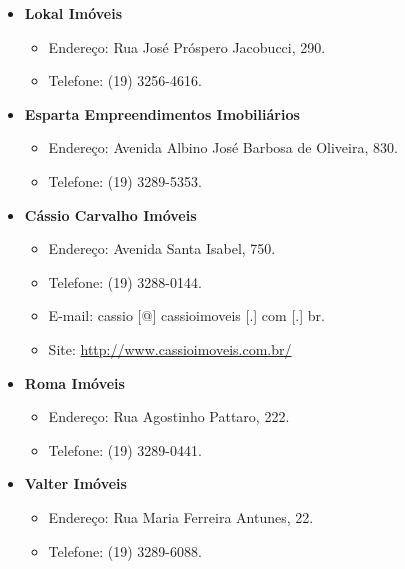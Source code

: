 \begin{itemize}
\item  \textbf{Lokal Imóveis}
\begin{itemize}
\item  Endereço: Rua José Próspero Jacobucci, 290.
\item  Telefone: (19) 3256-4616.
\end{itemize}
\end{itemize}

\begin{itemize}
\item  \textbf{Esparta Empreendimentos Imobiliários}
\begin{itemize}
\item  Endereço: Avenida Albino José Barbosa de Oliveira, 830.
\item  Telefone: (19) 3289-5353.
\end{itemize}
\end{itemize}

\begin{itemize}
\item  \textbf{Cássio Carvalho Imóveis}
\begin{itemize}
\item  Endereço: Avenida Santa Isabel, 750.
\item  Telefone: (19) 3288-0144.
\item  E-mail: cassio [@] cassioimoveis [.] com [.] br.
\item  Site: \url{http://www.cassioimoveis.com.br/}
\end{itemize}
\end{itemize}

\begin{itemize}
\item  \textbf{Roma Imóveis}
\begin{itemize}
\item  Endereço: Rua Agostinho Pattaro, 222.
\item  Telefone: (19) 3289-0441.
\end{itemize}
\end{itemize}

\begin{itemize}
\item  \textbf{Valter Imóveis}
\begin{itemize}
\item  Endereço: Rua Maria Ferreira Antunes, 22.
\item  Telefone: (19) 3289-6088.
\end{itemize}
\end{itemize}

